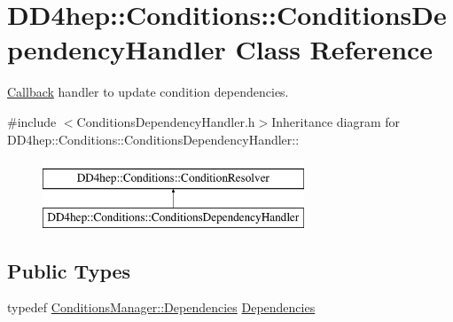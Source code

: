 \hypertarget{class_d_d4hep_1_1_conditions_1_1_conditions_dependency_handler}{
\section{DD4hep::Conditions::ConditionsDependencyHandler Class Reference}
\label{class_d_d4hep_1_1_conditions_1_1_conditions_dependency_handler}
}


\hyperlink{class_d_d4hep_1_1_callback}{Callback} handler to update condition dependencies.  


{\ttfamily \#include $<$ConditionsDependencyHandler.h$>$}Inheritance diagram for DD4hep::Conditions::ConditionsDependencyHandler::\begin{figure}[H]
\begin{center}
\leavevmode
\includegraphics[height=2cm]{class_d_d4hep_1_1_conditions_1_1_conditions_dependency_handler}
\end{center}
\end{figure}
\subsection*{Public Types}
\begin{DoxyCompactItemize}
\item 
typedef \hyperlink{class_d_d4hep_1_1_conditions_1_1_conditions_dependency_collection}{ConditionsManager::Dependencies} \hyperlink{class_d_d4hep_1_1_conditions_1_1_conditions_dependency_handler_a4a063b30ffccb0e30f3302f1537aef10}{Dependencies}
\end{DoxyCompactItemize}
